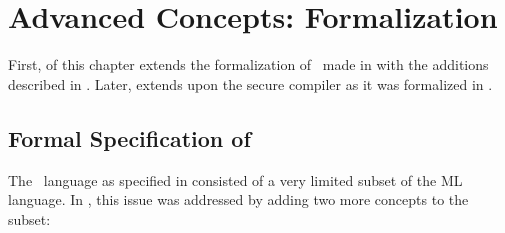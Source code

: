 \chapter{Advanced Concepts: Formalization}
\label{chap:FormalizationOfAdvancedConcepts}
First,  of this chapter extends the formalization of \MiniML\ made in  with the additions described in .
Later,  extends upon the secure compiler as it was formalized in .

\section{Formal Specification of \MiniML}
\label{sec:formalspec2}
The \MiniML\ language as specified in  consisted of a very limited subset of the ML language.
In , this issue was addressed by adding two more concepts to the subset:
